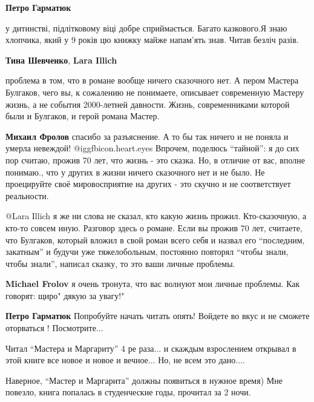 \begin{itemize}
\begin{itemize}
\textbf{Петро Гарматюк} 

у дитинстві, підлітковому віці добре сприймається. Багато казкового.Я знаю
хлопчика, який у 9 років цю книжку майже напам'ять знав. Читав безліч разів.


\textbf{Тина Шевченко}, \textbf{Lara Illich} 

проблема в том, что в романе вообще ничего сказочного нет. А пером Мастера
Булгаков, чего вы, к сожалению не понимаете, описывает современную Мастеру
жизнь, а не события 2000-летней давности. Жизнь, современниками которой были и
Булгаков, и герой романа Мастер.

\begin{itemize} %
\textbf{Михаил Фролов} спасибо за разъяснение. А то бы так ничего и не поняла и умерла невеждой! @igg{fbicon.heart.eyes} 
Впрочем, поделюсь \enquote{тайной}: я до сих пор считаю, прожив 70 лет, что жизнь - это сказка. Но, в отличие от вас, вполне понимаю., что у других в жизни ничего сказочного нет и не было.
Не проецируйте своё мировосприятие на других - это скучно и не соответствует реальности.
\end{itemize} %


@Lara Illich я же ни слова не сказал, кто какую жизнь прожил. Кто-сказочную, а
кто-то совсем иную. Разговор здесь о романе. Если вы прожив 70 лет, считаете,
что Булгаков, который вложил в свой роман всего себя и назвал его \enquote{последним,
закатным} и будучи уже тяжелобольным, постоянно повторял \enquote{чтобы знали, чтобы
знали}, написал сказку, то это ваши личные проблемы.


\textbf{Michael Frolov} я очень тронута, что вас волнуют мои личные проблемы. Как говорят: щиро" дякую за увагу!"

\textbf{Петро Гарматюк} Попробуйте начать читать опять! Войдете во вкус и не сможете оторваться ! Посмотрите...


Читал \enquote{Мастера и Маргариту} 4 ре раза... и скаждым взрослением открывал в этой
книге все новое и новое и вечное... Но, не всем это дано....

\end{itemize} %

Наверное, \enquote{Мастер и Маргарита} должны появиться в нужное время) Мне
повезло, книга попалась в студенческие годы, прочитал за 2 ночи.


\end{itemize}
